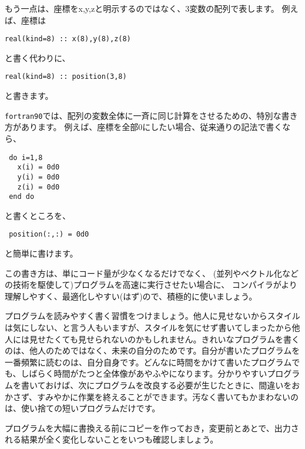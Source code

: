 \documentclass[a4,10pt]{article}
\begin{document}
もう一点は、座標をx,y,zと明示するのではなく、3変数の配列で表します。
例えば、座標は
\begin{screen}\begin{verbatim}
real(kind=8) :: x(8),y(8),z(8)
\end{verbatim}\end{screen}
と書く代わりに、
\begin{screen}\begin{verbatim}
real(kind=8) :: position(3,8)
\end{verbatim}\end{screen}
と書きます。

{\tt fortran90}では、配列の変数全体に一斉に同じ計算をさせるための、特別な書き方があります。
例えば、座標を全部0にしたい場合、従来通りの記法で書くなら、
\begin{screen}\begin{verbatim}
 do i=1,8
   x(i) = 0d0
   y(i) = 0d0
   z(i) = 0d0
 end do
\end{verbatim}\end{screen}
と書くところを、
\begin{screen}\begin{verbatim}
 position(:,:) = 0d0
\end{verbatim}\end{screen}
と簡単に書けます。

この書き方は、単にコード量が少なくなるだけでなく、
(並列やベクトル化などの技術を駆使して)プログラムを高速に実行させたい場合に、
コンパイラがより理解しやすく、最適化しやすい(はず)ので、積極的に使いましょう。

\begin{shadebox}
    プログラムを読みやすく書く習慣をつけましょう。他人に見せないからスタイルは気にしない、と言う人もいますが、スタイルを気にせず書いてしまったから他人には見せたくても見せられないのかもしれません。きれいなプログラムを書くのは、他人のためではなく、未来の自分のためです。自分が書いたプログラムを一番頻繁に読むのは、自分自身です。どんなに時間をかけて書いたプログラムでも、しばらく時間がたつと全体像があやふやになります。分かりやすいプログラムを書いておけば、次にプログラムを改良する必要が生じたときに、間違いをおかさず、すみやかに作業を終えることができます。汚なく書いてもかまわないのは、使い捨ての短いプログラムだけです。
\end{shadebox} 

\begin{shadebox}
	プログラムを大幅に書換える前にコピーを作っておき，変更前とあとで、出力される結果が全く変化しないことをいつも確認しましょう。
\end{shadebox}
\end{document}
